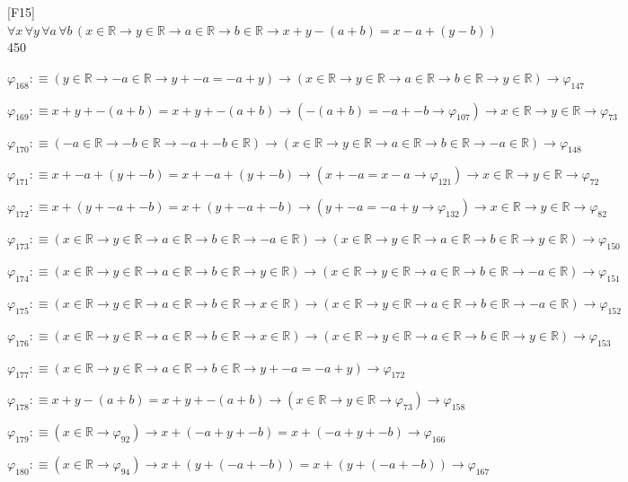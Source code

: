 \begin{fullproof}{[F15]}{$\forall x\,\forall y\,\forall a\,\forall b\,(x \in \mathbb{R} \to y \in \mathbb{R} \to a \in \mathbb{R} \to b \in \mathbb{R} \to x + y - (a + b) = x - a + (y - b))$}{450}
\begin{abbrevlist}
\item $\varphi_{168} :\equiv (y \in \mathbb{R} \to -a \in \mathbb{R} \to y + -a = -a + y) \to (x \in \mathbb{R} \to y \in \mathbb{R} \to a \in \mathbb{R} \to b \in \mathbb{R} \to y \in \mathbb{R}) \to \varphi_{147}$
\item $\varphi_{169} :\equiv x + y + -(a + b) = x + y + -(a + b) \to (-(a + b) = -a + -b \to \varphi_{107}) \to x \in \mathbb{R} \to y \in \mathbb{R} \to \varphi_{73}$
\item $\varphi_{170} :\equiv (-a \in \mathbb{R} \to -b \in \mathbb{R} \to -a + -b \in \mathbb{R}) \to (x \in \mathbb{R} \to y \in \mathbb{R} \to a \in \mathbb{R} \to b \in \mathbb{R} \to -a \in \mathbb{R}) \to \varphi_{148}$
\item $\varphi_{171} :\equiv x + -a + (y + -b) = x + -a + (y + -b) \to (x + -a = x - a \to \varphi_{121}) \to x \in \mathbb{R} \to y \in \mathbb{R} \to \varphi_{72}$
\item $\varphi_{172} :\equiv x + (y + -a + -b) = x + (y + -a + -b) \to (y + -a = -a + y \to \varphi_{132}) \to x \in \mathbb{R} \to y \in \mathbb{R} \to \varphi_{82}$
\item $\varphi_{173} :\equiv (x \in \mathbb{R} \to y \in \mathbb{R} \to a \in \mathbb{R} \to b \in \mathbb{R} \to -a \in \mathbb{R}) \to (x \in \mathbb{R} \to y \in \mathbb{R} \to a \in \mathbb{R} \to b \in \mathbb{R} \to y \in \mathbb{R}) \to \varphi_{150}$
\item $\varphi_{174} :\equiv (x \in \mathbb{R} \to y \in \mathbb{R} \to a \in \mathbb{R} \to b \in \mathbb{R} \to y \in \mathbb{R}) \to (x \in \mathbb{R} \to y \in \mathbb{R} \to a \in \mathbb{R} \to b \in \mathbb{R} \to -a \in \mathbb{R}) \to \varphi_{151}$
\item $\varphi_{175} :\equiv (x \in \mathbb{R} \to y \in \mathbb{R} \to a \in \mathbb{R} \to b \in \mathbb{R} \to x \in \mathbb{R}) \to (x \in \mathbb{R} \to y \in \mathbb{R} \to a \in \mathbb{R} \to b \in \mathbb{R} \to -a \in \mathbb{R}) \to \varphi_{152}$
\item $\varphi_{176} :\equiv (x \in \mathbb{R} \to y \in \mathbb{R} \to a \in \mathbb{R} \to b \in \mathbb{R} \to x \in \mathbb{R}) \to (x \in \mathbb{R} \to y \in \mathbb{R} \to a \in \mathbb{R} \to b \in \mathbb{R} \to y \in \mathbb{R}) \to \varphi_{153}$
\item $\varphi_{177} :\equiv (x \in \mathbb{R} \to y \in \mathbb{R} \to a \in \mathbb{R} \to b \in \mathbb{R} \to y + -a = -a + y) \to \varphi_{172}$
\item $\varphi_{178} :\equiv x + y - (a + b) = x + y + -(a + b) \to (x \in \mathbb{R} \to y \in \mathbb{R} \to \varphi_{73}) \to \varphi_{158}$
\item $\varphi_{179} :\equiv (x \in \mathbb{R} \to \varphi_{92}) \to x + (-a + y + -b) = x + (-a + y + -b) \to \varphi_{166}$
\item $\varphi_{180} :\equiv (x \in \mathbb{R} \to \varphi_{94}) \to x + (y + (-a + -b)) = x + (y + (-a + -b)) \to \varphi_{167}$
\end{abbrevlist}
\end{fullproof}
